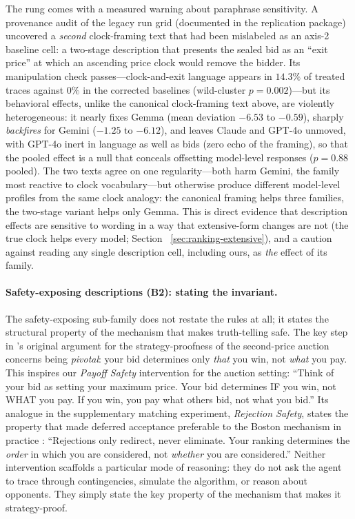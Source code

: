 The rung comes with a measured warning about paraphrase sensitivity. A
provenance audit of the legacy run grid (documented in the replication
package) uncovered a \emph{second} clock-framing text that had been
mislabeled as an axis-2 baseline cell: a two-stage description that presents
the sealed bid as an ``exit price'' at which an ascending price clock would
remove the bidder. Its manipulation check passes---clock-and-exit language
appears in $14.3\%$ of treated traces against $0\%$ in the corrected
baselines (wild-cluster $p = 0.002$)---but its behavioral effects, unlike
the canonical clock-framing text above, are violently heterogeneous: it
nearly fixes Gemma (mean deviation $-6.53$ to $-0.59$), sharply
\emph{backfires} for Gemini ($-1.25$ to $-6.12$), and leaves Claude and
GPT-4o unmoved, with GPT-4o inert in language as well as bids (zero echo of
the framing), so that the pooled effect is a null that conceals offsetting
model-level responses ($p = 0.88$ pooled). The two texts agree on one
regularity---both harm Gemini, the family most reactive to clock
vocabulary---but otherwise produce different model-level profiles from the
same clock analogy: the canonical framing helps three families, the
two-stage variant helps only Gemma. This is direct evidence that
description effects are sensitive to wording in a way that extensive-form
changes are not (the true clock helps every model; Section~%
\ref{sec:ranking-extensive}), and a caution against reading any single
description cell, including ours, as \emph{the} effect of its family.

\paragraph{Safety-exposing descriptions (B2): stating the invariant.}
The safety-exposing sub-family does not restate the rules at all; it states
the structural property of the mechanism that makes truth-telling safe. The
key step in \citet{vickrey1961counterspeculation}'s original argument for the
strategy-proofness of the second-price auction concerns being
\emph{pivotal}: your bid determines only \emph{that} you win, not \emph{what}
you pay. This inspires our \emph{Payoff Safety} intervention for the auction
setting: ``Think of your bid as setting your maximum price. Your bid
determines IF you win, not WHAT you pay. If you win, you pay what others bid,
not what you bid.'' Its analogue in the supplementary matching experiment, \emph{Rejection
Safety}, states the property that made deferred acceptance preferable to the
Boston mechanism in practice \citep{abdulkadirouglu2003school}: ``Rejections
only redirect, never eliminate. Your ranking determines the \emph{order} in
which you are considered, not \emph{whether} you are considered.'' Neither
intervention scaffolds a particular mode of reasoning: they do not ask the
agent to trace through contingencies, simulate the algorithm, or reason about
opponents. They simply state the key property of the mechanism that makes it
strategy-proof.

